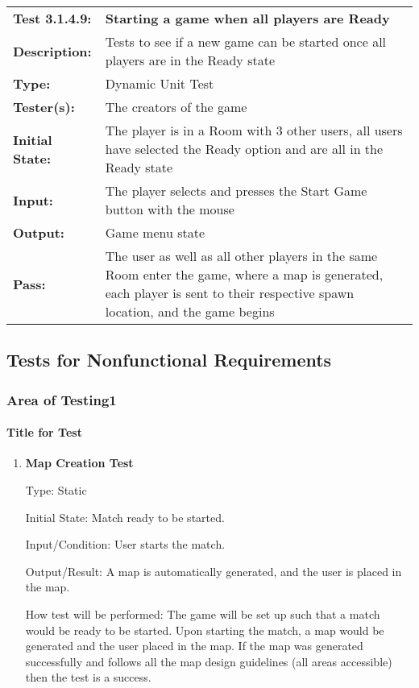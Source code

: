 \documentclass[12pt, titlepage]{article}
\begin{document}
\begin{enumerate}
\begin{mdframed}[linewidth=1pt]
\begin{tabularx}{\textwidth}{@{}p{3cm}X@{}}
{\bf Test 3.1.4.9:} & {\bf Starting a game when all players are Ready}\\[\baselineskip]
{\bf Description:} & Tests to see if a new game can be started once all players are in the Ready state\\[0.5\baselineskip]
{\bf Type:} & Dynamic Unit Test\\[0.5\baselineskip]
{\bf Tester(s):} & The creators of the game\\[0.5\baselineskip]
{\bf Initial State:} & The player is in a Room with 3 other users, all users have selected the Ready option and are all in the Ready state\\[0.5\baselineskip]
{\bf Input:} & The player selects and presses the Start Game button with the mouse \\[0.5\baselineskip]
{\bf Output:} & Game menu state\\[0.5\baselineskip]
{\bf Pass:} & The user as well as all other players in the same Room enter the game, where a map is generated, each player is sent to their respective spawn location, and the game begins
\end{tabularx}
\end{mdframed}

\subsection{Tests for Nonfunctional Requirements}
\subsubsection{Area of Testing1}
		
\paragraph{Title for Test}
\begin{enumerate}
\item{}
\textbf{Map Creation Test}

Type: Static
					
Initial State: Match ready to be started.  
					
Input/Condition: User starts the match. 
					
Output/Result: A map is automatically generated, and the user is placed in the map. 
					
How test will be performed: The game will be set up such that a match would be ready to be started. Upon starting the match, a map would be generated and the user placed in the map. If the map was generated successfully and follows all the map design guidelines (all areas accessible) then the test is a success. 
					

\end{enumerate}
\end{enumerate}
\end{document}
